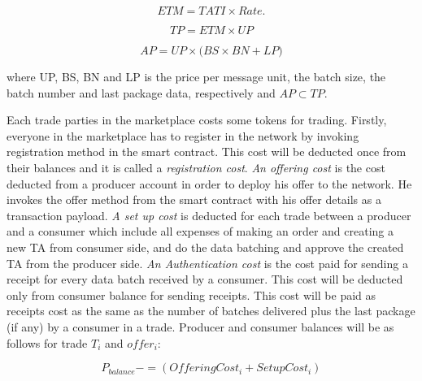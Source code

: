 \documentclass[letterpaper, 10 pt, conference]{ieeeconf}  %
\makeatletter
\newcommand{\mathleft}{\@fleqntrue\@mathmargin15pt}
\newcommand{\mynote}[1]{{\leavevmode\smaller\itshape\color{red}\{#1\}}}
\makeatother
\begin{document}
\vspace{-0.2 cm}
\mathleft
\begin{equation}
\textbf {$ETM = TATI \times Rate. $}    
\end{equation}
 
\vspace{-0.5 cm}

\mathleft
\begin{equation}
\textbf {$TP = ETM \times UP $} 
\end{equation}

\vspace{-0.5 cm}

\mathleft
\begin{equation}
\textbf {$AP = UP \times \big(BS \times BN + LP\big)$} 
\end{equation}


where UP, BS, BN and LP is the price per message unit, the batch size, the batch number and last package data, respectively and $ AP \subset TP$.

Each trade parties in the marketplace costs some tokens for trading. Firstly, everyone in the marketplace has to register in the network by invoking registration method in the smart contract. This cost will be deducted once from their balances and it is called a \textit{registration cost}. \textit{ An offering cost} is the cost deducted from a producer account in order to deploy his offer to the network. He invokes the offer method from the smart contract with his offer details as a transaction payload. \textit{ A set up cost} is deducted for each trade between a producer and a consumer which include all expenses of making an order and creating a new TA from consumer side, and do the data batching and approve the created TA from the producer side. \textit{An Authentication cost} is the cost paid for sending a receipt for every data batch received by a consumer. This cost will be deducted only from consumer balance for sending receipts. This cost will be paid  as receipts cost as the same as the number of batches delivered plus the last package (if any) by a consumer in a trade. Producer and consumer balances will be as follows for trade $T_{i}$ and $offer_{i}$:

\vspace{-0.3 cm}

\mathleft
\begin{equation}
\textbf{$P_{balance} -= ( Offering Cost_{i} + Setup Cost_{i} )$} 
\end{equation}
\end{document}
